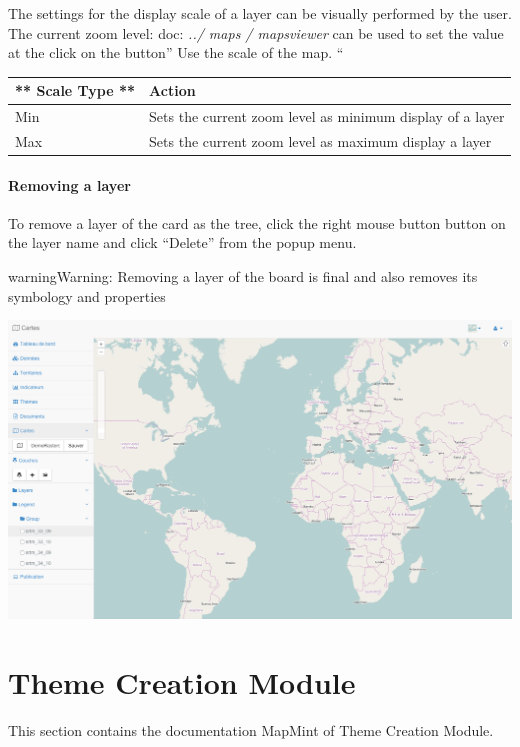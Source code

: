 \documentclass[letterpaper,10pt,english]{sphinxmanual}
\begin{document}
The settings for the display scale of a layer can be visually performed by the user. The current zoom level: doc: \emph{../ maps / mapsviewer} can be used to set the value at the click on the button'' Use the scale of the map. ``

\begin{tabulary}{\linewidth}{|L|L|}
\hline

** Scale Type **
 & 
\textbf{Action}
\\
\hline
Min
 & 
Sets the current zoom level as minimum display of a layer
\\
\hline
Max
 & 
Sets the current zoom level as maximum display a layer
\\
\hline\end{tabulary}



\subsubsection{Removing a layer}
\label{maps/layerstree:suppression-d-une-couche}
To remove a layer of the card as the tree, click the right mouse button button on the layer name and click ``Delete'' from the popup menu.

\begin{notice}{warning}{Warning:}
Removing a layer of the board is final and also removes its symbology and properties
\end{notice}

\includegraphics{maps-module-preview.png}


\chapter{Theme Creation Module}
\label{themes/index:themes}\label{themes/index::doc}\label{themes/index:module-de-creation-de-themes}
This section contains the documentation MapMint of Theme Creation Module.
\end{document}
